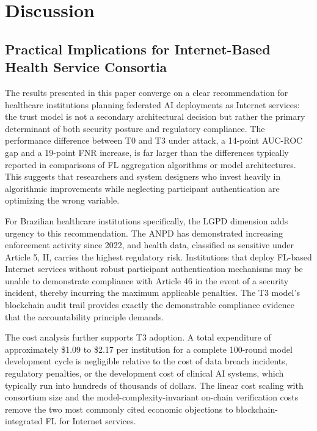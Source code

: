 \documentclass{sbc2023}
\begin{document}
\section{Discussion}
\label{sec:discussion}

\subsection{Practical Implications for Internet-Based Health Service Consortia}

The results presented in this paper converge on a clear recommendation for healthcare institutions planning federated AI deployments as Internet services: the trust model is not a secondary architectural decision but rather the primary determinant of both security posture and regulatory compliance. The performance difference between T0 and T3 under attack, a 14-point AUC-ROC gap and a 19-point FNR increase, is far larger than the differences typically reported in comparisons of FL aggregation algorithms or model architectures. This suggests that researchers and system designers who invest heavily in algorithmic improvements while neglecting participant authentication are optimizing the wrong variable.

For Brazilian healthcare institutions specifically, the LGPD dimension adds urgency to this recommendation. The ANPD has demonstrated increasing enforcement activity since 2022, and health data, classified as sensitive under Article 5, II, carries the highest regulatory risk. Institutions that deploy FL-based Internet services without robust participant authentication mechanisms may be unable to demonstrate compliance with Article 46 in the event of a security incident, thereby incurring the maximum applicable penalties. The T3 model's blockchain audit trail provides exactly the demonstrable compliance evidence that the accountability principle demands.

The cost analysis further supports T3 adoption. A total expenditure of approximately \$1.09 to \$2.17 per institution for a complete 100-round model development cycle is negligible relative to the cost of data breach incidents, regulatory penalties, or the development cost of clinical AI systems, which typically run into hundreds of thousands of dollars. The linear cost scaling with consortium size and the model-complexity-invariant on-chain verification costs remove the two most commonly cited economic objections to blockchain-integrated FL for Internet services.
\end{document}

